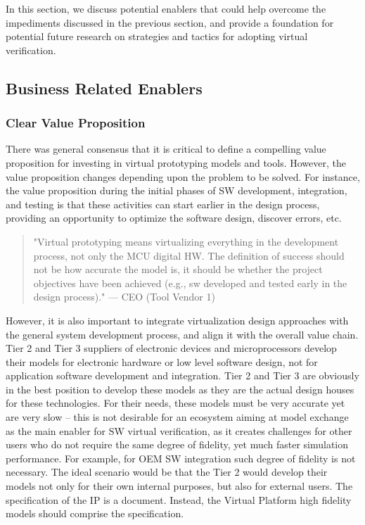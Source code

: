 In this section, we discuss potential enablers that could help overcome the impediments discussed in the previous section, and provide a foundation for potential future research on strategies and tactics for adopting virtual verification.

\subsection{Business Related Enablers}
\subsubsection{Clear Value Proposition}
There was general consensus that it is critical to define a compelling value proposition for investing in virtual prototyping models and tools. However, the value proposition changes depending upon the problem to be solved. For instance, the value proposition during the initial phases of SW development, integration, and testing is that these activities can start earlier in the design process, providing an opportunity to optimize the software design, discover errors, etc.

\begin{quote}
"Virtual prototyping means virtualizing everything in the development process, not only the MCU digital HW. The definition of success should not be how accurate the model is, it should be whether the project objectives have been achieved (e.g., sw developed and tested early in the design process)."
— CEO (Tool Vendor 1)
\end{quote}

However, it is also important to integrate virtualization design approaches with the general system development process, and align it with the overall value chain.
Tier 2 and Tier 3 suppliers of electronic devices and microprocessors develop their models for electronic hardware or low level software design, not for application software development and integration. Tier 2 and Tier 3 are obviously in the best position to develop these models as they are the actual design houses for these technologies. For their needs, these models must be very accurate yet are very slow -- this is not desirable for an ecosystem aiming at model exchange as the main enabler for SW virtual verification, as it creates challenges for other users who do not require the same degree of fidelity, yet much faster simulation performance. For example, for OEM SW integration such degree of fidelity is not necessary.  The ideal scenario would be that the Tier 2 would develop their models not only for their own internal purposes, but also  for external users. The specification of the IP is a document. Instead, the Virtual Platform high fidelity models should comprise the specification. 


